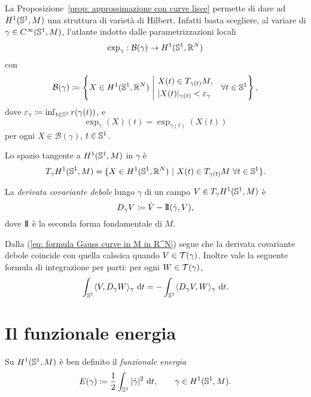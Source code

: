 \begin{oss}\label{oss: H1 varietà di Hilbert}
La Proposizione~\ref{prop: approssimazione con curve lisce} permette di dare ad \(H^1(\mathbb{S}^1,M)\) una struttura di varietà di Hilbert. Infatti basta scegliere, al variare di \(\gamma \in C^\infty(\mathbb{S}^1,M)\), l'atlante indotto dalle parametrizzazioni locali
\[
\exp_\gamma : \mathcal{B}(\gamma) \to H^1(\mathbb{S}^1,\mathbb{R}^N)
\]
con 
\[
	\mathcal{B}(\gamma) \coloneq \left\{X \in H^1(\Sp^1,\R^N) \ \middle| \ 
	\begin{aligned}
		&X(t) \in T_{\gamma(t)}M, \\
		&|X(t)|_{\gamma(t)} < \ve_\gamma
	\end{aligned}
	\quad  \forall t \in \Sp^1
	\right\},
\]
dove \(\varepsilon_\gamma \coloneq \inf_{t \in \mathbb{S}^1} r(\gamma(t))\), e
\[
\exp_\gamma(X)(t) = \exp_{\gamma(t)}(X(t))
\]
per ogni \(X \in \mathcal{B}(\gamma)\), \(t \in \mathbb{S}^1\). 

Lo spazio tangente a \(H^1(\mathbb{S}^1,M)\) in \(\gamma\) è
\[
	T_\gamma H^1(\mathbb{S}^1,M) = \{ X \in H^1(\mathbb{S}^1,\mathbb{R}^N) \ | \ X(t) \in T_{\gamma(t)}M \ \forall t \in \mathbb{S}^1\}.
\]
\end{oss}

\begin{defi}
	La \textit{derivata covariante debole} lungo \(\gamma\) di un campo \(V \in T_\gamma H^1(\mathbb{S}^1,M)\) è 
	\[
		D_\gamma V \coloneq \dot V - \mathrm{I\!I}(\dot \gamma, V),
	\]
	dove \(\mathrm{I\!I}\) è la seconda forma fondamentale di \(M\). 
\end{defi}
\begin{oss}
	Dalla (\ref{eq: formula Gauss curve in M in R^N}) segue che la derivata covariante debole coincide con quella calssica quando \(V \in \mathcal{T}(\gamma)\). Inoltre vale la seguente formula di integrazione per parti: per ogni \(W \in \mathcal{T}(\gamma)\),
	\[
		\int_{\mathbb{S}^1} \langle V, D_\gamma W \rangle_\gamma \ \mathrm{d} t = - \int_{\mathbb{S}^1} \langle D_\gamma V, W \rangle_\gamma \ \mathrm{d} t.
	\]
\end{oss}

\section{Il funzionale energia}

Su \(H^1(\mathbb{S}^1,M)\) è ben definito il \textit{funzionale energia}
\[
	E(\gamma) \coloneq \frac{1}{2}\int_{\mathbb{S}^1} |\dot \gamma |^2 \ \mathrm{d} t, \qquad \gamma \in H^1(\mathbb{S}^1,M).
\]

